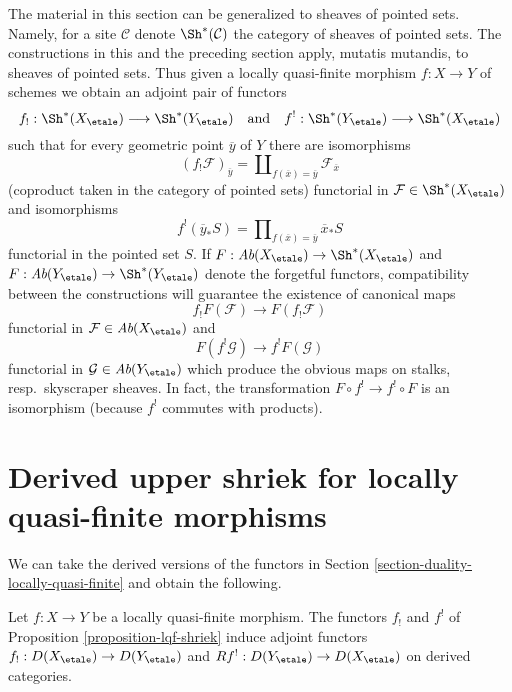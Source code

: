 \begin{remark}
\label{remark-pointed-sets}
The material in this section can be generalized to sheaves of pointed sets.
Namely, for a site $\mathcal{C}$ denote $\Sh^*(\mathcal{C})$ the category of
sheaves of pointed sets. The constructions in this and the preceding section
apply, mutatis mutandis, to sheaves of pointed sets. Thus given a locally
quasi-finite morphism $f : X \to Y$ of schemes we obtain
an adjoint pair of functors
$$
f_! : \Sh^*(X_\etale) \longrightarrow \Sh^*(Y_\etale)
\quad\text{and}\quad
f^! : \Sh^*(Y_\etale) \longrightarrow \Sh^*(X_\etale)
$$
such that for every geometric point $\overline{y}$ of $Y$ there are
isomorphisms
$$
(f_!\mathcal{F})_{\overline{y}} =
\coprod\nolimits_{f(\overline{x}) = \overline{y}}
\mathcal{F}_{\overline{x}}
$$
(coproduct taken in the category of pointed sets) functorial in
$\mathcal{F} \in \Sh^*(X_\etale)$ and isomorphisms
$$
f^!(\overline{y}_*S) =
\prod\nolimits_{f(\overline{x}) = \overline{y}}
\overline{x}_*S
$$
functorial in the pointed set $S$. If
$F : \textit{Ab}(X_\etale) \to \Sh^*(X_\etale)$ and
$F : \textit{Ab}(Y_\etale) \to \Sh^*(Y_\etale)$
denote the forgetful functors, compatibility between the constructions
will guarantee the existence of canonical maps
$$
f_!F(\mathcal{F}) \longrightarrow F(f_!\mathcal{F})
$$
functorial in $\mathcal{F} \in \textit{Ab}(X_\etale)$ and
$$
F(f^!\mathcal{G}) \longrightarrow f^!F(\mathcal{G})
$$
functorial in $\mathcal{G} \in \textit{Ab}(Y_\etale)$
which produce the obvious maps on stalks, resp.\ skyscraper sheaves.
In fact, the transformation $F \circ f^! \to f^! \circ F$ is an isomorphism
(because $f^!$ commutes with products).
\end{remark}







\section{Derived upper shriek for locally quasi-finite morphisms}
\label{section-derived-duality-locally-quasi-finite}

\noindent
We can take the derived versions of the functors in
Section \ref{section-duality-locally-quasi-finite}
and obtain the following.

\begin{lemma}
\label{lemma-lqf-shriek-derived}
Let $f : X \to Y$ be a locally quasi-finite morphism. The functors
$f_!$ and $f^!$ of Proposition \ref{proposition-lqf-shriek} induce
adjoint functors $f_! : D(X_\etale) \to D(Y_\etale)$
and $Rf^! : D(Y_\etale) \to D(X_\etale)$ on derived categories.
\end{lemma}

